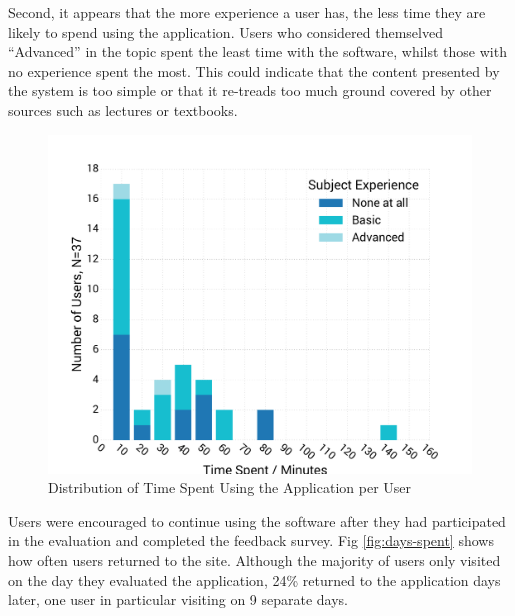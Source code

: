 \documentclass[bsc,twoside,singlespacing,parskip,logo,notimes,normalheadings]{infthesis}
\begin{document}
    Second, it appears that the more experience a user has, the less
    time they are likely to spend using the application. Users who
    considered themselved ``Advanced'' in the topic spent the least
    time with the software, whilst those with no experience spent the
    most. This could indicate that the content presented by the system
    is too simple or that it re-treads too much ground covered by
    other sources such as lectures or textbooks.

    \begin{figure}[!hb]
      \centering
      \vspace{-2mm}
      \includegraphics[width=.80\textwidth, trim=0 20 0 45, clip]{img/time_distribution.pdf}
      \captionsetup{width=\textwidth, justification=centering}
      \caption{Distribution of Time Spent Using the Application per User}\label{fig:time-hist}
    \end{figure}

    Users were encouraged to continue using the software after they
    had participated in the evaluation and completed the feedback
    survey. Fig \ref{fig:days-spent} shows how often users returned to
    the site. Although the majority of users only visited on the day
    they evaluated the application, 24\% returned to the application
    days later, one user in particular visiting on 9 separate days.
\end{document}
